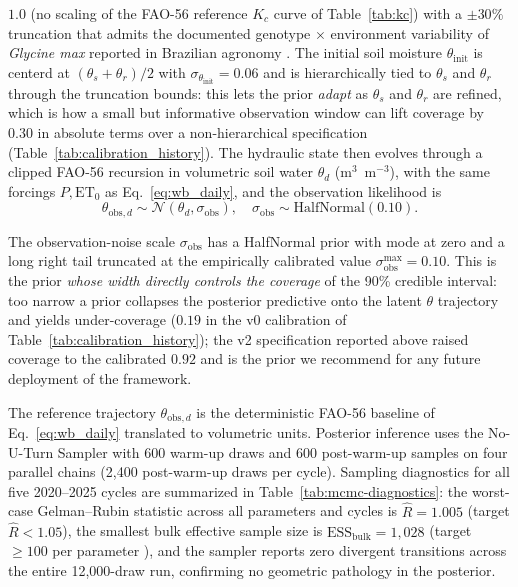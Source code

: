 \documentclass[review,5p,times]{elsarticle}
\begin{document}
$1.0$ (no scaling of the FAO-56 reference $K_c$ curve of
Table~\ref{tab:kc}) with a $\pm 30\%$ truncation that admits the
documented genotype $\times$ environment variability of
\textit{Glycine max} reported in Brazilian agronomy
\citep{EmbrapaSoja}. The initial soil moisture
$\theta_{\mathrm{init}}$ is centerd at $(\theta_s+\theta_r)/2$ with
$\sigma_{\theta_{\mathrm{init}}}=0.06$ and is hierarchically tied to
$\theta_s$ and $\theta_r$ through the truncation bounds: this lets
the prior \emph{adapt} as $\theta_s$ and $\theta_r$ are refined,
which is how a small but informative observation window can lift
coverage by $0.30$ in absolute terms over a non-hierarchical
specification (Table~\ref{tab:calibration_history}). The hydraulic
state then evolves through a clipped FAO-56 recursion in volumetric
soil water $\theta_d$ (m$^3$~m$^{-3}$), with the same forcings $P,
\mathrm{ET}_0$ as Eq.~\ref{eq:wb_daily}, and the observation
likelihood is
%
\begin{equation}
\theta_{\mathrm{obs},d} \sim \mathcal{N}(\theta_d, \sigma_{\mathrm{obs}}),
\quad \sigma_{\mathrm{obs}} \sim \mathrm{HalfNormal}(0.10).
\label{eq:obs_likelihood}
\end{equation}

The observation-noise scale $\sigma_{\mathrm{obs}}$ has a HalfNormal
prior with mode at zero and a long right tail truncated at the
empirically calibrated value $\sigma_{\mathrm{obs}}^{\max}=0.10$.
This is the prior \emph{whose width directly controls the coverage}
of the 90\% credible interval: too narrow a prior collapses the
posterior predictive onto the latent $\theta$ trajectory and
yields under-coverage ($0.19$ in the v0 calibration of
Table~\ref{tab:calibration_history}); the v2 specification reported
above raised coverage to the calibrated $0.92$ and is the prior we
recommend for any future deployment of the framework.

The reference trajectory $\theta_{\mathrm{obs},d}$ is the
deterministic FAO-56 baseline of Eq.~\ref{eq:wb_daily} translated to
volumetric units. Posterior inference uses the No-U-Turn Sampler
\cite{Hoffman2014} with 600 warm-up draws and 600 post-warm-up samples
on four parallel chains (2{,}400 post-warm-up draws per cycle).
Sampling diagnostics for all five 2020--2025 cycles are summarized in
Table~\ref{tab:mcmc-diagnostics}: the worst-case Gelman--Rubin
statistic across all parameters and cycles is $\hat{R}=1.005$ (target
$\hat{R}<1.05$), the smallest bulk effective sample size is
$\mathrm{ESS}_\mathrm{bulk}=1{,}028$ (target $\geq 100$ per parameter
\citep{Vehtari2021}), and the sampler reports zero divergent
transitions across the entire 12{,}000-draw run, confirming no
geometric pathology in the posterior.
\end{document}
